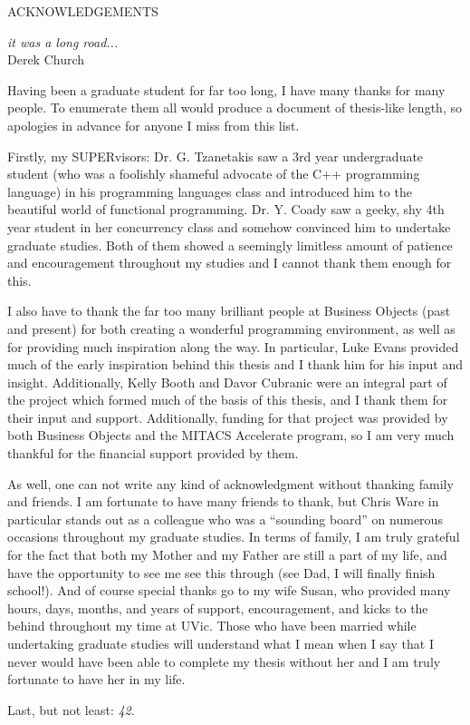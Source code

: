 \newpage
{}

\begin{center}
ACKNOWLEDGEMENTS
\end{center}

\begin{flushright}
\textit{it was a long road...}
\\
Derek Church\\
\end{flushright}

Having been a graduate student for far too long, I have many thanks for many people.  To enumerate them all would produce a document of thesis-like length, so apologies in advance for anyone I miss from this list.

Firstly, my SUPERvisors: Dr. G. Tzanetakis saw a 3rd year undergraduate student (who was a foolishly shameful advocate of the C++ programming language) in his programming languages class and introduced him to the beautiful world of functional programming.  Dr. Y. Coady saw a geeky, shy 4th year student in her concurrency class and somehow convinced him to undertake graduate studies.  Both of them showed a seemingly limitless amount of patience and encouragement throughout my studies and I cannot thank them enough for this.

I also have to thank the far too many brilliant people at Business Objects (past and present) for both creating a wonderful programming environment, as well as for providing much inspiration along the way.  In particular, Luke Evans provided much of the early inspiration behind this thesis and I thank him for his input and insight.  Additionally, Kelly Booth and Davor Cubranic were an integral part of the project which formed much of the basis of this thesis, and I thank them for their input and support.  Additionally, funding for that project was provided by both Business Objects and the MITACS Accelerate program, so I am very much thankful for the financial support provided by them.

As well, one can not write any kind of acknowledgment without thanking family and friends.  I am fortunate to have many friends to thank, but Chris Ware in particular stands out as a colleague who was a ``sounding board'' on numerous occasions throughout my graduate studies.  In terms of family, I am truly grateful for the fact that both my Mother and my Father are still a part of my life, and have the opportunity to see me see this through (see Dad, I will finally finish school!).  And of course special thanks go to my wife Susan, who provided many hours, days, months, and years of support, encouragement, and kicks to the behind throughout my time at UVic.  Those who have been married while undertaking graduate studies will understand what I mean when I say that I never would have been able to complete my thesis without her and I am truly fortunate to have her in my life.

Last, but not least: \emph{42}.
